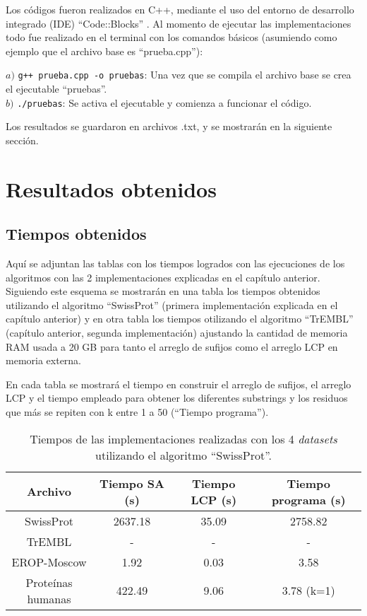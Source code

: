 Los códigos fueron realizados en C++, mediante el uso del entorno de desarrollo integrado (IDE) ``Code::Blocks'' \cite{codeblocks}. Al momento de ejecutar las implementaciones todo fue realizado en el terminal con los comandos básicos (asumiendo como ejemplo que el archivo base es ``prueba.cpp''):

$a)$ \texttt{g++ prueba.cpp -o pruebas}: Una vez que se compila el archivo base se crea el ejecutable ``pruebas''.\\
$b)$ \texttt{./pruebas}: Se activa el ejecutable y comienza a funcionar el código.

Los resultados se guardaron en archivos .txt, y se mostrarán en la siguiente sección.

\section{Resultados obtenidos}

\subsection{Tiempos obtenidos}

Aquí se adjuntan las tablas con los tiempos logrados con las ejecuciones de los algoritmos con las 2 implementaciones explicadas en el capítulo anterior. Siguiendo este esquema se mostrarán en una tabla los tiempos obtenidos utilizando el algoritmo ``SwissProt'' (primera implementación explicada en el capítulo anterior) y en otra tabla los tiempos otilizando el algoritmo ``TrEMBL'' (capítulo anterior, segunda implementación) ajustando la cantidad de memoria RAM usada a 20 GB para tanto el arreglo de sufijos como el arreglo LCP en memoria externa. 

En cada tabla se mostrará el tiempo en construir el arreglo de sufijos, el arreglo LCP y el tiempo empleado para obtener los diferentes substrings y los residuos que más se repiten con k entre 1 a 50 (``Tiempo programa'').

\begin{table}[h]
\centering
\begin{tabular}{|c|c|c|c|}
\hline
\textbf{Archivo}  & \textbf{Tiempo SA (s)} & \textbf{Tiempo LCP (s)} & \textbf{Tiempo programa (s)} \\ \hline
SwissProt         & 2637.18                & 35.09                   & 2758.82                         \\
TrEMBL            & -                & -                &        -                  \\
EROP-Moscow       & 1.92                   & 0.03                    & 3.58                         \\
Proteínas humanas & 422.49                 & 9.06                    & 3.78 (k=1)                         \\ \hline
\end{tabular}
\caption{Tiempos de las implementaciones realizadas con los 4 \textit{datasets} utilizando el algoritmo ``SwissProt''.}
\label{tb:labelr3}
\end{table}

